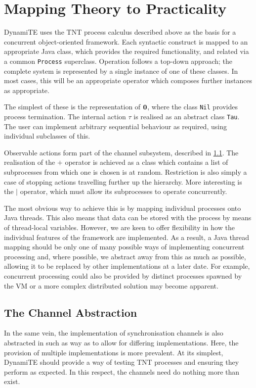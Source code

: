 \documentclass{acm_proc_article-sp}
\begin{document}
\section{Mapping Theory to Practicality}
\label{dynamite}

DynamiTE uses the TNT process calculus described above as the basis for
a concurrent object-oriented framework.  Each syntactic construct is
mapped to an appropriate Java class, which provides the required
functionality, and related via a common \texttt{Process} superclass.
Operation follows a top-down approach; the complete system is
represented by a single instance of one of these classes.  In most
cases, this will be an appropriate operator which composes further
instances as appropriate.

The simplest of these is the representation of $\textbf{0}$, where the class
\texttt{Nil} provides process termination.  The internal action $\tau$
is realised as an abstract class \texttt{Tau}.  The user can implement
arbitrary sequential behaviour as required, using individual subclasses
of this.

Observable actions form part of the channel subsystem, described in
\ref{channels}.  The realisation of the $+$ operator is achieved as a
class which contains a list of subprocesses from which one is chosen is
at random.  Restriction is also simply a case of stopping actions
travelling further up the hierarchy.  More interesting is the $\mid$
operator, which must allow its subprocesses to operate concurrently.

The most obvious way to achieve this is by mapping individual processes
onto Java threads.  This also means that data can be stored with the
process by means of thread-local variables.  However, we are keen to
offer flexibility in how the individual features of the framework are
implemented.  As a result, a Java thread mapping should be only one of
many possible ways of implementing concurrent processing and, where
possible, we abstract away from this as much as possible, allowing it to
be replaced by other implementations at a later date.  For example,
concurrent processing could also be provided by distinct processes
spawned by the VM or a more complex distributed solution may become
apparent.

\subsection{The Channel Abstraction}
\label{channels}

In the same vein, the implementation of synchronisation channels is also
abstracted in such as way as to allow for differing implementations.
Here, the provision of multiple implementations is more prevalent.  At
its simplest, DynamiTE should provide a way of testing TNT processes and
ensuring they perform as expected.  In this respect, the channels need
do nothing more than exist.
\end{document}
